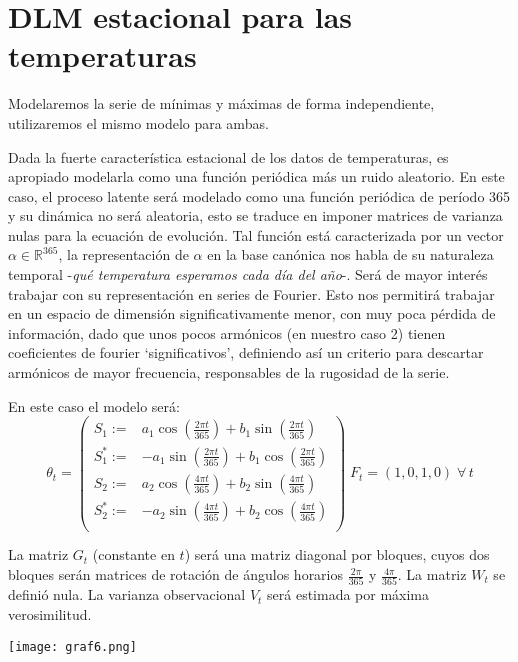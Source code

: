 \documentclass{article}\usepackage[]{graphicx}\usepackage[]{color}
\newcommand{\RR}{\mathbb{R}}
\begin{document}
\section{DLM estacional para las temperaturas}

Modelaremos la serie de mínimas y máximas de forma independiente, utilizaremos el mismo modelo para ambas.

Dada la fuerte característica estacional de los datos de temperaturas, es apropiado modelarla como una función periódica más un ruido aleatorio. En este caso, el proceso latente será modelado como una función periódica de período 365 y su dinámica no será aleatoria, esto se traduce en imponer matrices de varianza nulas para la ecuación de evolución.
Tal función está caracterizada por un vector $\alpha \in \RR^{365}$, la representación de $\alpha$ en la base canónica nos habla de su naturaleza temporal -\textit{qué temperatura esperamos cada día del año}-. Será de mayor interés trabajar con su representación en series de Fourier. Esto nos permitirá trabajar en un espacio de dimensión significativamente menor, con muy poca pérdida de información, dado que unos pocos armónicos (en nuestro caso 2) tienen coeficientes de fourier `significativos', definiendo así un criterio para descartar armónicos de mayor frecuencia, responsables de la rugosidad de la serie.

En este caso el modelo será:
$$\theta_t=\left(\begin{array}{lr}
S_1:=& a_1\cos\left(\frac{2\pi t}{365}\right) + b_1 \sin\left(\frac{2\pi t}{365}\right) \\
S_1^*:=& -a_1\sin\left(\frac{2\pi t}{365}\right) + b_1 \cos\left(\frac{2\pi t}{365}\right) \\
S_2:= &a_2\cos\left(\frac{4\pi t}{365}\right) + b_2 \sin\left(\frac{4\pi t}{365}\right) \\
S_2^*:=& -a_2\sin\left(\frac{4\pi t}{365}\right) + b_2 \cos\left(\frac{4\pi t}{365}\right) \\
\end{array}\right)\; F_t=(1,0,1,0) \; \forall \, t$$

La matriz $G_t$ (constante en $t$) será una matriz diagonal por bloques, cuyos dos bloques serán matrices de rotación de ángulos horarios $\frac{2\pi}{365}$ y $\frac{4\pi}{365}$. La matriz $W_t$ se definió nula. La varianza observacional $V_t$ será estimada por máxima verosimilitud.

\begin{center}
\texttt{[image: graf6.png]}
\vspace{-.75em}
\label{fig:graf6}
\end{center}
\end{document}
